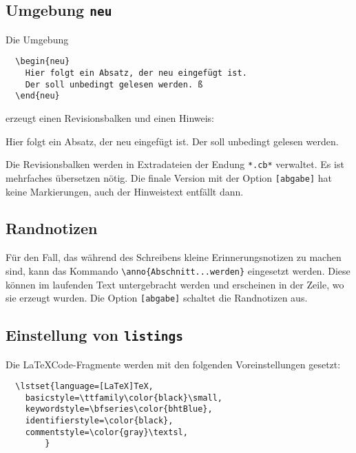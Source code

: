 \subsection{Umgebung \texttt{neu}}\label{ss.bht.rev}

Die Umgebung 
\begin{lstlisting}
  \begin{neu}
    Hier folgt ein Absatz, der neu eingefügt ist.
    Der soll unbedingt gelesen werden. ß
  \end{neu}
\end{lstlisting}
erzeugt einen Revisionsbalken und einen Hinweis:

\begin{neu}
    Hier folgt ein Absatz, der neu eingefügt ist. 
    Der soll unbedingt gelesen werden. 
\end{neu}

Die Revisionsbalken werden in  Extradateien der Endung \texttt{*.cb*} verwaltet. Es
ist mehrfaches übersetzen  nötig.  Die finale Version mit  der Option \verb|[abgabe]|
hat keine Markierungen, auch der Hinweistext entfällt dann.

\subsection{Randnotizen}
Für  den Fall,  das  während  des Schreibens  kleine  Erinnerungsnotizen zu  machen
   sind,    kann    das   Kommando
\verb|\anno{Abschnitt...werden}| eingesetzt werden.  Diese können im laufenden Text
untergebracht werden und erscheinen in der Zeile, wo sie erzeugt wurden. Die Option
\verb|[abgabe]| schaltet die Randnotizen aus.

\subsection{Einstellung von \texttt{listings}}\label{ss.bht.listings}


Die \LaTeX\-Code-Fragmente werden mit den folgenden Voreinstellungen gesetzt:
\begin{lstlisting}
  \lstset{language=[LaTeX]TeX,
 	basicstyle=\ttfamily\color{black}\small,
 	keywordstyle=\bfseries\color{bhtBlue},
 	identifierstyle=\color{black}, 
 	commentstyle=\color{gray}\textsl,
        }
\end{lstlisting}

